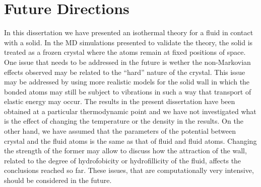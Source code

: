 \documentclass[b5paper,openright,10pt]{book}
\begin{document}
\chapter{Future Directions}\label{Chap:Future}
In this dissertation we have presented an isothermal theory for a fluid in contact with a solid. 
In the MD simulations presented to validate the theory, the solid is treated as a frozen crystal where the atoms remain at fixed positions of space.
One issue that needs to be addressed in the future is wether the non-Markovian effects observed may be related to the ``hard'' nature of the crystal. This issue may be  addressed by  using more realistic models for the solid wall in which the bonded atoms may still be subject to vibrations in such a way that transport of elastic energy may occur.
The results in the present dissertation have been obtained at a particular thermodynamic point and we have not investigated what is the effect of  changing the temperature or the density in the results. On the other hand, we have assumed that the parameters of the potential between crystal and the fluid atoms is the same as that of fluid and fluid atoms. Changing the strength of the former may allow to discuss how the attraction of the wall, related to the degree of hydrofobicity or hydrofillicity of the fluid, affects the conclusions reached so far.  These issues, that are computationally very intensive,  should be considered in the future.


\end{document}
